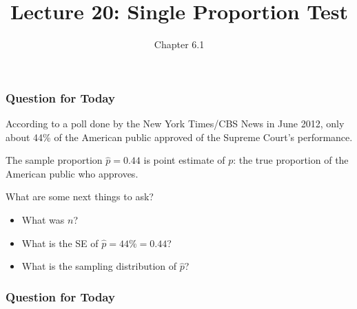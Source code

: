 \documentclass[slides]{beamer}
\title{Lecture 20: Single Proportion Test}
\author{Chapter 6.1}
\date{}
\newcommand{\blue}[1]{\textcolor{blue2}{#1}}
\newcommand{\xbar}{\overline{x}}
\newcommand{\phat}{\widehat{p}}
\begin{document}
\begin{frame}
\titlepage
\end{frame}

\begin{frame}[fragile]
\frametitle{Question for Today}

According to a poll done by the New York Times/CBS News in June 2012, only about 44\% of the American public approved of the Supreme Court's performance.  

\vspace{0.25cm}

\pause The sample proportion $\phat=0.44$ is \blue{point estimate} of $p$: the true proportion of the American public who approves.  

\vspace{0.25cm}

\pause What are some next things to ask?

\vspace{0.25cm}

\pause\begin{itemize}
\item What was $n$?
\item What is the \blue{SE} of $\phat=44\%=0.44$?
\item What is the sampling distribution of $\phat$?
\end{itemize}

\end{frame}


\begin{frame}[fragile]
\frametitle{Question for Today}

%
%
%
%
\end{frame}
\end{document}
